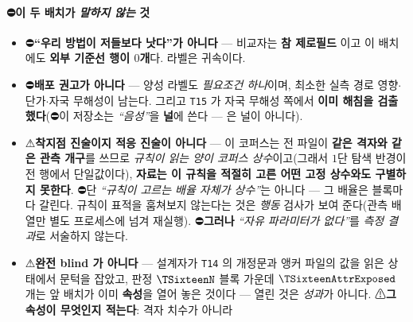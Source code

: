 \documentclass[11pt]{report}
\numberwithin{equation}{chapter}
\numberwithin{figure}{chapter}
\numberwithin{table}{chapter}
\begin{document}
\paragraph{⛔이 두 배치가 \emph{말하지 않는} 것}
\begin{itemize}
  \item ⛔\textbf{``우리 방법이 저들보다 낫다''가 아니다} --- 비교자는 \textbf{참 제로필드}
        이고 이 배치에도 \textbf{외부 기준선 행이 $0$개}다. 라벨은 귀속이다.
  \item ⛔\textbf{배포 권고가 아니다} --- 양성 라벨도 \emph{필요조건 하나}이며, 최소한
        실측 경로 영향$\cdot$단가$\cdot$자국 무해성이 남는다. 그리고 \texttt{T15} 가
        자국 무해성 쪽에서 \textbf{이미 해침을 검출했다}(⛔이 저장소는 \emph{``음성''}을
        \textbf{널}에 쓴다 --- \texttt{\TFifteenLabel} 은 널이 아니다).
  \item ⚠\textbf{착지점 진술이지 적응 진술이 아니다} --- 이 코퍼스는 전 파일이 \textbf{같은
        격자와 같은 관측 개구}를 쓰므로 \emph{규칙이 읽는 양이 코퍼스 상수}이고(그래서
        $1$단 탐색 반경이 전 행에서 단일값이다), \textbf{자료는 이 규칙을 적절히 고른 어떤
        고정 상수와도 구별하지 못한다}. ⛔단 \emph{``규칙이 고르는 배율 자체가 상수''}는
        아니다 --- 그 배율은 블록마다 갈린다. 규칙이 표적을 훔쳐보지 않는다는 것은
        \emph{행동} 검사가 보여 준다(관측 배열만 별도 프로세스에 넘겨 재실행).
        ⛔\textbf{그러나} \emph{``자유 파라미터가 없다''}를 \emph{측정 결과}로 서술하지
        않는다.
  \item ⚠\textbf{완전 blind 가 아니다} --- 설계자가 \texttt{T14} 의 개정문과 앵커 파일의
        값을 읽은 상태에서 문턱을 잡았고, 판정 $\TSixteenN$ 블록 가운데
        $\TSixteenAttrExposed$ 개는 앞 배치가 이미 \textbf{속성}을 열어 놓은 것이다 --- 열린
        것은 \emph{성과}가 아니다. ⚠\textbf{그 속성이 무엇인지 적는다}: 격자 치수가 아니라

\end{itemize}
\end{document}
